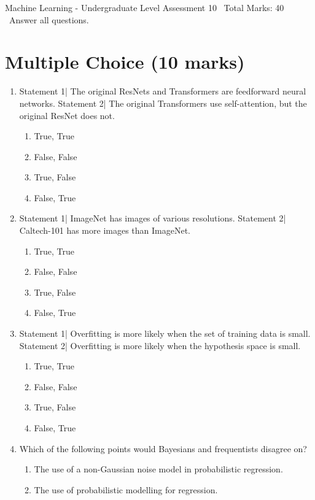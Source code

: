 \documentclass[12pt]{article}
\begin{document}
\begin{center}
Machine Learning - Undergraduate Level Assessment 10 \
Total Marks: 40 \
Answer all questions.
\end{center}

\section*{Multiple Choice (10 marks)}
\begin{enumerate}[label=\arabic*.]
\item Statement 1| The original ResNets and Transformers are feedforward neural networks. Statement 2| The original Transformers use self-attention, but the original ResNet does not.
\begin{enumerate}[label=(\alph*)]
    \item True, True
    \item False, False
    \item True, False
    \item False, True
\end{enumerate}
\item Statement 1| ImageNet has images of various resolutions. Statement 2| Caltech-101 has more images than ImageNet.
\begin{enumerate}[label=(\alph*)]
    \item True, True
    \item False, False
    \item True, False
    \item False, True
\end{enumerate}
\item Statement 1| Overfitting is more likely when the set of training data is small. Statement 2| Overfitting is more likely when the hypothesis space is small.
\begin{enumerate}[label=(\alph*)]
    \item True, True
    \item False, False
    \item True, False
    \item False, True
\end{enumerate}
\item Which of the following points would Bayesians and frequentists disagree on?
\begin{enumerate}[label=(\alph*)]
    \item The use of a non-Gaussian noise model in probabilistic regression.
    \item The use of probabilistic modelling for regression.

\end{enumerate}
\end{enumerate}
\end{document}

